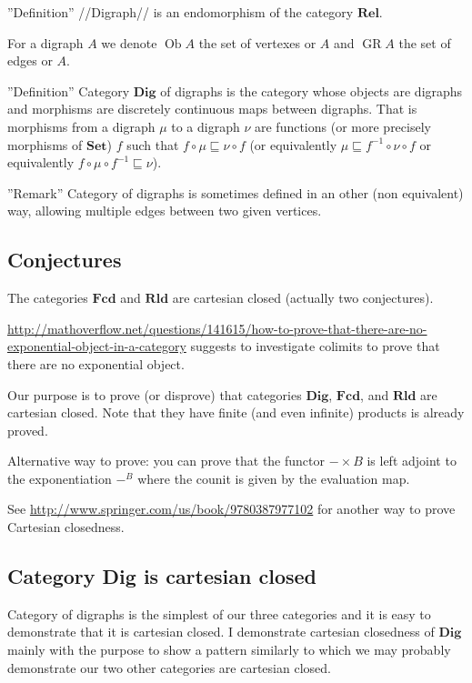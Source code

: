 ''Definition'' //Digraph// is an endomorphism of the category $\mathbf{Rel}$.

For a digraph $A$ we denote $\operatorname{Ob} A$ the set of vertexes or $A$ and $\operatorname{GR} A$ the set of edges or $A$.

''Definition'' Category $\mathbf{Dig}$ of digraphs is the category whose objects are digraphs and morphisms are discretely continuous maps between digraphs. That is morphisms from a digraph $\mu$ to a digraph $\nu$ are functions (or more precisely morphisms of $\mathbf{Set}$) $f$ such that $f \circ \mu \sqsubseteq \nu \circ f$ (or equivalently $\mu \sqsubseteq f^{- 1} \circ \nu \circ f$ or equivalently $f \circ \mu \circ f^{- 1} \sqsubseteq \nu$).

''Remark'' Category of digraphs is sometimes defined in an other (non equivalent) way, allowing multiple edges between two given vertices.

\subsection{Conjectures}

\begin{conjecture}
  The categories $\mathbf{Fcd}$ and $\mathbf{Rld}$ are
  cartesian closed (actually two conjectures).
\end{conjecture}

\url{http://mathoverflow.net/questions/141615/how-to-prove-that-there-are-no-exponential-object-in-a-category}
suggests to investigate colimits to prove that there are no exponential
object.

Our purpose is to prove (or disprove) that categories $\mathbf{Dig}$, $\mathbf{Fcd}$, and $\mathbf{Rld}$ are cartesian closed. Note that they have finite (and even infinite) products is already proved.

Alternative way to prove:
you can prove that the functor $-\times B$ is left adjoint to the exponentiation $-^B$ where the counit is given by the evaluation map.

See \url{http://www.springer.com/us/book/9780387977102} for another way to prove Cartesian closedness.

\subsection{Category Dig is cartesian closed}

Category of digraphs is the simplest of our three categories and it is easy to demonstrate that it is cartesian closed. I demonstrate cartesian closedness of $\mathbf{Dig}$ mainly with the purpose to show a pattern similarly to which we may probably demonstrate our two other categories are cartesian closed.

